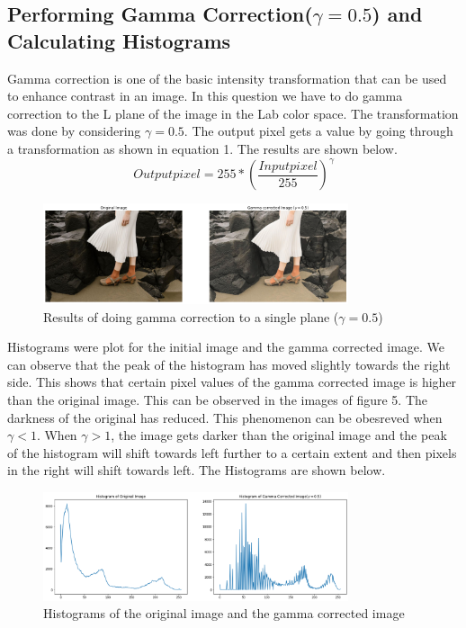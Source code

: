 \documentclass[11pt]{article}
\begin{document}
\begin{flushleft}
\section{Performing Gamma Correction($\gamma = 0.5$) and Calculating Histograms}
Gamma correction is one of the basic intensity transformation that can be used to enhance contrast in an image. In this question we have to do gamma correction to the L plane of the image in the Lab color space. The transformation was done by considering $\gamma = 0.5$. The output pixel gets a value by going through a transformation as shown in equation 1. 
The results are shown below.
\begin{equation}\label{Equation 1: Gamma Correction Transformation}
    Output pixel = 255*\left(\frac{Input pixel}{255}\right)^{\gamma}
\end{equation}
\begin{figure}[htp]
    \centering
    \includegraphics[width=0.8\textwidth]{Gammacorrected.png}
    \caption{Results of doing gamma correction to a single plane ($\gamma = 0.5$)}
\end{figure}
Histograms were plot for the initial image and the gamma corrected image. We can observe that the peak of the histogram has moved slightly towards the right side. This shows that certain pixel values of the gamma corrected image is higher than the original image. This can be observed in the images of figure 5. The darkness of the original has reduced. 
This phenomenon can be obesreved when $\gamma < 1$. When $\gamma > 1$, the image gets darker than the original image and the peak of the histogram will shift towards left further to a certain extent and then pixels in the right will shift towards left. The Histograms are shown below.
\begin{figure}[htp]
    \centering
    \includegraphics[width=0.8\textwidth]{GammacorrectedHistograms.png}
    \caption{Histograms of the original image and the gamma corrected image}
\end{figure}

\end{flushleft}
\end{document}
